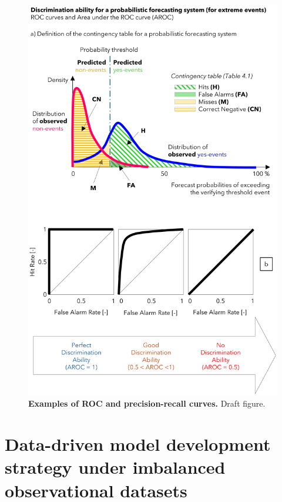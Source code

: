 \begin{figure}[htbp]
\centering
\includegraphics[width=\textwidth]{roc_examples.png}
\caption{\textbf{Examples of ROC and precision-recall curves.} Draft figure.}
\label{fig:roc_examples}
\end{figure}

\section{Data-driven model development strategy under imbalanced observational datasets}
\label{integrated_experimental_strategy_model_development_imbalanced_data}


